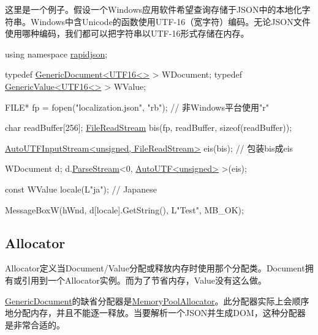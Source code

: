 这里是一个例子。假设一个\+Windows应用软件希望查询存储于\+J\+S\+O\+N中的本地化字符串。\+Windows中含\+Unicode的函数使用\+U\+T\+F-\/16（宽字符）编码。无论\+J\+S\+O\+N文件使用哪种编码，我们都可以把字符串以\+U\+T\+F-\/16形式存储在内存。


\begin{DoxyCode}
\textcolor{keyword}{using namespace }\hyperlink{namespacerapidjson}{rapidjson};

\textcolor{keyword}{typedef} \hyperlink{class_generic_document}{GenericDocument<UTF16<>} > WDocument;
\textcolor{keyword}{typedef} \hyperlink{class_generic_value}{GenericValue<UTF16<>} > WValue;

FILE* fp = fopen(\textcolor{stringliteral}{"localization.json"}, \textcolor{stringliteral}{"rb"}); \textcolor{comment}{// 非Windows平台使用"r"}

\textcolor{keywordtype}{char} readBuffer[256];
\hyperlink{class_file_read_stream}{FileReadStream} bis(fp, readBuffer, \textcolor{keyword}{sizeof}(readBuffer));

\hyperlink{class_auto_u_t_f_input_stream}{AutoUTFInputStream<unsigned, FileReadStream>} eis(bis);  \textcolor{comment}{//
       包装bis成eis}

WDocument d;
d.\hyperlink{class_generic_document_afe94c0abc83a20f2d7dc1ba7677e6238}{ParseStream}<0, \hyperlink{struct_auto_u_t_f}{AutoUTF<unsigned>} >(eis);

\textcolor{keyword}{const} WValue locale(L\textcolor{stringliteral}{"ja"}); \textcolor{comment}{// Japanese}

MessageBoxW(hWnd, d[locale].GetString(), L\textcolor{stringliteral}{"Test"}, MB\_OK);
\end{DoxyCode}
\hypertarget{md_Commun_Externe_RapidJSON_doc_internals_Allocator}{}\subsection{Allocator}\label{md_Commun_Externe_RapidJSON_doc_internals_Allocator}
{\ttfamily Allocator}定义当{\ttfamily Document}/{\ttfamily Value}分配或释放内存时使用那个分配类。{\ttfamily Document}拥有或引用到一个{\ttfamily Allocator}实例。而为了节省内存，{\ttfamily Value}没有这么做。

{\ttfamily \hyperlink{class_generic_document}{Generic\+Document}}的缺省分配器是{\ttfamily \hyperlink{class_memory_pool_allocator}{Memory\+Pool\+Allocator}}。此分配器实际上会顺序地分配内存，并且不能逐一释放。当要解析一个\+J\+S\+O\+N并生成\+D\+O\+M，这种分配器是非常合适的。

